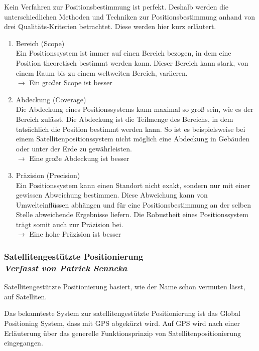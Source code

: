 Kein Verfahren zur Positionsbestimmung ist perfekt. 
Deshalb werden die unterschiedlichen Methoden und Techniken zur Positionsbestimmung anhand von drei Qualitäts-Kriterien betrachtet. Diese werden hier kurz erläutert.

\begin{enumerate}
\item Bereich (Scope)\\
Ein Positionssystem ist immer auf einen Bereich bezogen, in dem eine Position theoretisch bestimmt werden kann. Dieser Bereich kann stark, von einem Raum bis zu einem weltweiten Bereich, variieren.\\
$\longrightarrow$ Ein großer Scope ist besser
\item Abdeckung (Coverage)\\
Die Abdeckung eines Positionssystems kann maximal so groß sein, wie es der Bereich zulässt. Die Abdeckung ist die Teilmenge des Bereichs, in dem tatsächlich die Position bestimmt werden kann. So ist es beispielsweise bei einem Satellitenpositionssystem nicht möglich eine Abdeckung in Gebäuden oder unter der Erde zu gewährleisten.\\
$\longrightarrow$ Eine große Abdeckung ist besser
\item Präzision (Precision)\\
Ein Positionssystem kann einen Standort nicht exakt, sondern nur mit einer gewissen Abweichung bestimmen. Diese Abweichung kann von Umwelteinflüssen abhängen und für eine Positionsbestimmung an der selben Stelle abweichende Ergebnisse liefern. Die Robustheit eines Positionssystem trägt somit auch zur Präzision bei. \\
$\longrightarrow$ Eine hohe Präzision ist besser
\end{enumerate}
\cite[S.183]{Schiller2004}


\subsubsection[Satellitengestützte Positionierung]{Satellitengestützte Positionierung
 \\ \textnormal{\small{\textit {Verfasst von Patrick Senneka}}}}

Satellitengestützte Positionierung basiert, wie der Name schon vermuten lässt, auf Satelliten. 

Das bekannteste System zur satellitengestützte Positionierung ist das Global Positioning System, dass mit GPS abgekürzt wird. Auf GPS wird nach einer Erläuterung über das generelle Funktionsprinzip von Satellitenpositionierung eingegangen.

